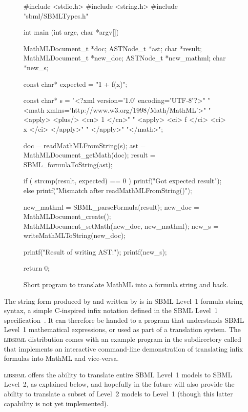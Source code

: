 \documentclass{sbmlmanual}
\newcommand{\libsbml}{\textsc{libsbml}}
\begin{document}
\begin{figure}[b]
  \begin{codeVerbatim}[C,flexiblecolumns=false]
#include <stdio.h>
#include <string.h>
#include "sbml/SBMLTypes.h"

int
main (int argc, char *argv[])
{
    MathMLDocument_t *doc;
    ASTNode_t        *ast;
    char             *result;
    MathMLDocument_t *new_doc;
    ASTNode_t        *new_mathml;
    char             *new_s;

    const char* expected = "1 + f(x)";

    const char* s = "<?xml version='1.0' encoding='UTF-8'?>"
        "<math xmlns='http://www.w3.org/1998/Math/MathML'>"
        "  <apply> <plus/> <cn> 1 </cn>"
        "                  <apply> <ci> f </ci> <ci> x </ci> </apply>"
        "  </apply>"
        "</math>";

    doc    = readMathMLFromString(s);
    ast    = MathMLDocument_getMath(doc);
    result = SBML_formulaToString(ast);

    if ( strcmp(result, expected) == 0 ) 
    {
        printf("Got expected result\n");
    }
    else
    {
        printf("Mismatch after readMathMLFromString()\n");
    }

    new_mathml = SBML_parseFormula(result);
    new_doc    = MathMLDocument_create();
    MathMLDocument_setMath(new_doc, new_mathml);
    new_s      = writeMathMLToString(new_doc);

    printf("Result of writing AST:\n");
    printf(new_s);

    return 0;
}
  \end{codeVerbatim}
  \caption{Short program to translate MathML into a formula string and back.}
  \label{fig:eg-round-trip}
\end{figure}

The string form produced by  and written by
 is in SBML Level~1 formula string syntax, a
simple C-inspired infix notation defined in the SBML Level~1
specification~\cite{hucka_2001b}.  It can therefore be handed to a program
that understands SBML Level~1 mathematical expressions, or used as part of
a translation system.  The \libsbml{} distribution comes with an example
program in the  subdirectory called 
that implements an interactive command-line demonstration of translating
infix formulas into MathML and vice-versa.

\libsbml{} offers the ability to translate entire SBML Level~1 models to
SBML Level~2, as explained below, and hopefully in the future will also
provide the ability to translate a subset of Level~2 models to Level~1
(though this latter capability is not yet implemented).
\end{document}
